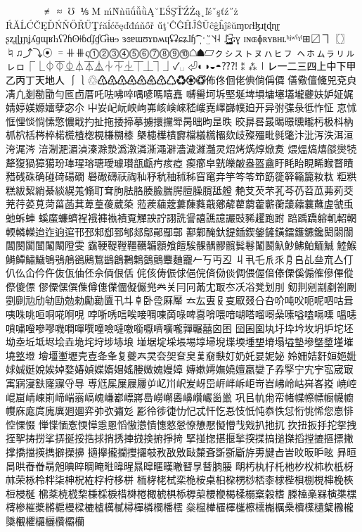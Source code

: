 ⊄⊅⊊⊋∉⌅⌆∥∦≢≅≈≶≷℧⋚⋛⅕⌘Ḿ
ḿǸǹǖǘǚǜĄ˘ĽŚŞŤŹŻą˛ľśˇşťź˝ż
ŔĂĹĆČĘĎŃŇŐŘŰŢŕăĺćčęďđńňőř
űţ˙ĈĜĤĴŜŬĉĝĥĵŝŭɱʋɾɬɮɹʈɖɳɽ
ʂʐɻɭɟɲʝʎɡɰʁħʕʔɦʘǂɓɗʄɠƓɨʉɘ
ɜɞɐɯʊɤɒʍɥʢʡɕʑɺɧ͡ˈˌˑ‿̏˥˦˧˨
˩̥̬̹̜̟̠̩̯̽˞̴̤̰̼̝̞̘̙̪̺̻̚ɢɣ
ɪɴɶɸʀʏʙʜʟʰʲʷˁˠˡ⊞〼ヿ〖〗♮♫⤴⤵⦿
゠⧺⧻ς⓵⓶⓷⓸⓹⓺⓻⓼⓽⓾☖☗▱ㇰㇱㇲㇳㇴㇵㇶㇷ
ㇸㇹㇺㇻㇼㇽㇾㇿ⎾⎿⏀⏁⏂⏃⏄⏅⏆⏇⏈⏉⏊⏋⏌✓␣
⏎◐◑◒◓⁇⁈⁑⁂㆐㆑㆒㆓㆔㆕㆖㆗㆘㆙㆚㆛㆜㆝㆞㆟
⎰⎱♲♳♴♵♶♷♸♹♺♻♼♽゙゚⃝佈佟佪佬倎倘偁僲
僐儆儃儵兕兗㒵凊凢剗勌勖勻匜卣厝吒呿咈啐喁喭嗎嘻嚞
嚩嚳坷坼𡌛埏埤塤墉𡑮壒壠虁妋妒姃娓婧婷媄嫄𡢽孽宓尒
屮𡚴屺岏岟岣岪峐𡸴崍嵇嶁嶤嶧巋幞廹开异弣弽彔彽怍怔
怘怵恇悝惔惝愫憼憹戢扚扯拖捼揥摹擄擐攩斝昺昢昫昰昳
晈𣇄晷晸暍暻曛曨杇极枓枘枛柼栝梣椊楉𣗄楂楤榥槏㮶㯃
槩槵𣜿樻𣝣檔檥㰏欛欬歧殩殭毗毿氅汴沘泻泆洱洹洿浘涔
涪淛淝湄湞溱滁漐潙潡潾澌澠澼濇濊濰灎灵炤烤焫焞焮煑
煨熅熇熺燄爕㸿犛𤟱猧獐獦玢琫瑆瑢瑭璦璩瓉瓿甗㽲痎瘂
瘈癤皁皝皪皶盎盔盦盱眊眙睍睎睺瞀瞔矠𥒎硃确碰𥔎碭礀
礜礮礴祆祹秈𥝱秔秞秫秭窅𥧄竎竽笒笭笻筯簁簳𥶡籭籹粏
粔粠糕紱絜綃綦緂縨羗翛耵耷胊胠胳腠腧腨腭膻臊臗䑛艠
艴𦫿芡芣芤芩芿苕苽茀茢茭茺荇荽莧菏菑菡萁萆葟葰葳蒅
蒞蒺𦹀蔲蔞蔯蕤蕺薌薢藋藭藿蘄蘅蘐𧃴蘘蘸虗虢䖝虵蚸蛼
螇䗪蠊蠐裎𧚄褲褹襀覔觶詇詝詡詵諐譆譙譩讝豉豨趯跑跗
踣踽蹻𨉷䡄軺輞輭轔𨏍迨迮逈逭邗邳邾郄郅郇郯鄔鄖鄢鄣
鄯鄴醃釱鍉鍤鍥鎣鏟鐄鐳鑊鑣鑱閎閟閬閶闋闐闓䦰闞隥雯
靎鞕鞮鞺韁韉韛顖飧饘騃髁髃髎髖鬂鬈䰗鬭魞魦鮄鮊鮞鯎
鯥鯸鰣鱏鱐鱥鴝鴞鵃鵒鶊鶖鷀鶬鶼𪆐鷧鸇麞麯龗𠂉丂丏丒
丩丮乇𠂢乑㐆𠂤乩亝㐬亼仃仈仫仚仱仵伖佤伷伾佘𠈓佷佸
侂侅俦侲俅俋俒㑪俲倓倜偎偓偣傣傈傒傓傕傪𠌫傱傺傻僄
僇僳𠎁僎𠍱僔僡㒒𠏹儗𠑊兠𠔉关冃冋㒼冘冣冭㓇𠗖凳划刖
𠝏剕剜剬剷劄劂𠠇劘𠠺劤劺劻勊勑𠢹勷匵卂𠥼𠦝卧卺厤厴
𠫓厷叀𠬝㕝㕞叕㕣叴吤吨㕮呃呢呬咕咠咦咮咷咺哃𠵅哬哯
哱哳唀唁唉唼啁㖦啇㖨啤𠷡啽喂喑㗅嗒𠺕𠹭喿嗉嗌嗑嗝㗚
嗢𠹤嗩嘨𠽟嘇嘐嘰㗴嘽噀噇噞噠噭㘅嚈嚌嚝嚨嚲囅囍囟囨
囶囷𡈁𡉕圩𡉻坅坆坍𡉴坨坯坳坴坵坻𡋤𡋗垚垝垞垨埗𡋽埌
𡌶𡍄埞埰㙊埸埻埽堄堞堧堹𡏄塉塌塧墊墋墍墏墐墔墝墪墱
𡑭壃壍壢壳壴夅夆复夔𡗗㚑夽㚙奆㚖𦰩奟𡙇奵奶奼妟妮妼
姈姍姞姧姮𡜆𡝂㛏娍娗娧娭婥婺媋媜媟媠媢媱媵媺媿嫚嫜
嫥嫰嫮嫵嬈嬗嬴孌孒孨孯宁宄𡧃宖宬㝡㝢寎寖㝬㝫寱寽㝵
尃尩𡱖屟屧屨屰𡴭𡵅𡵸𡵢岈岊㟁𡶡𡶜岠岢岧𡶒岭岵𡶷峉𡷠
𡸳崆崐崫崝崠崱崹㟨嵡嵪㟴嵰𡼞㟽嶈㠀嶗嶰嶴𡽶巑巗𡿺巤
巩㠯㠶㡀帟帾幉㡜幖㡡幭幮𢅻庥庬庹廆廙𢌞廽弈𢎭弞彇彣
彲彾徏徢忇忋忒忓忔忢忮忯忳㤗怢怤㤚恌悕您𢛳悱悾惈惙
惮惵愐愙愞愺㥯慁慆慠𢡛憒憓憗憥憭𢢫懕懝懵𢦏戣扒扡扤
扻扭扳抙拕𢪸拽挃挐𢭏𢭐挲挵挻挼捁捄捎𢭆捙𢰝𢮦捬掙𢰤
掔掽揔揕揠揫揬揲搞搥搩搯摚摝摳摽撇撑撟擋擌擕擗𢷡擤
擿㩮攏攔㩳攞攲敄敔敫敺斄斊斲斵斸斿旉旔㫖旹旼昄昈昡
昪晅晑晎㫪𣇃𣇵𣆶晪晬晭晻暀暐暒㬎暭暱暵㬚㬜㫗朁朒𣍲
朙𣏓𣏒杍杔杝𣏐𣏤𣏕杴𣏚枒𣏟荣栐柃柈柒柛柷𣑊𣑑𣑋栘栟
栭𣑥栳栻栾桅桉桌桕桗㭷桫桮桼梂梐梖㭭梘梙梚梜梪梫梴
梻棻𣓤𣕚棃棅棌棙棤棥棬棷椃椇㮇𣖔㮍楆楩楬楺榒㮤榖榰
榺榼槀槑𣘹𣙇𣘸槣槮槯槳㯍槴槾樑樚樝𣜜樲樳樿橉橺橎橒
橤𣜌檋㯰檡𣝤檫檽櫆櫔櫐櫝𣟿𣟧櫱櫲櫳櫽𣠤欋欏欐欑𣠽欗
